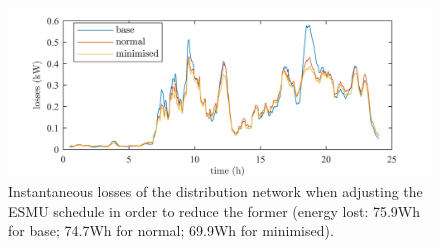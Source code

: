 \begin{figure}\centering
	\includegraphics{_chapter1/fig/ts-losses-2}
\caption{Instantaneous losses of the distribution network when adjusting the ESMU schedule in order to reduce the former (energy lost: 75.9Wh for base; 74.7Wh for normal; 69.9Wh for minimised).}
\label{ch1:fig:ts-losses}
\end{figure}